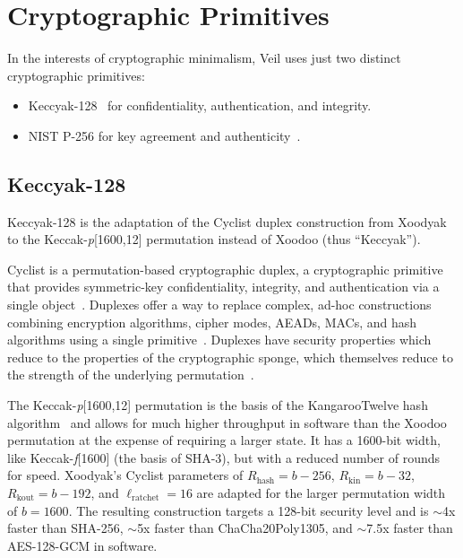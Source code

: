 \section{Cryptographic Primitives}\label{sec:cryptographic-primitives}

In the interests of cryptographic minimalism, Veil uses just two distinct cryptographic primitives:

\begin{itemize}
    \item Keccyak-128~\cite{daemen2020,bertoni2018} for confidentiality, authentication, and integrity.
    \item NIST P-256 for key agreement and authenticity~\cite{fips1864}.
\end{itemize}

\subsection{Keccyak-128}\label{subsec:keccyak}

Keccyak-128 is the adaptation of the Cyclist duplex construction from Xoodyak~\cite{daemen2020} to the
Keccak-\emph{p}[1600,12] permutation instead of Xoodoo (thus ``Keccyak'').

Cyclist is a permutation-based cryptographic duplex, a cryptographic primitive that provides symmetric-key
confidentiality, integrity, and authentication via a single object~\cite{daemen2020}.
Duplexes offer a way to replace complex, ad-hoc constructions combining encryption algorithms, cipher modes,
AEADs, MACs, and hash algorithms using a single primitive~\cite{daemen2020, bertoni2011duplex}.
Duplexes have security properties which reduce to the properties of the cryptographic sponge, which themselves reduce to
the strength of the underlying permutation~\cite{bertoni2008}.

The Keccak-\emph{p}[1600,12] permutation is the basis of the KangarooTwelve hash algorithm~\cite{bertoni2018} and allows
for much higher throughput in software than the Xoodoo permutation at the expense of requiring a larger state.
It has a 1600-bit width, like Keccak-\emph{f}[1600] (the basis of SHA-3), but with a reduced number of rounds for speed.
Xoodyak's Cyclist parameters of $R_\text{hash}=b-256$, $R_\text{kin}=b-32$, $R_\text{kout}=b-192$, and
$\ell_\text{ratchet}=16$ are adapted for the larger permutation width of $b=1600$.
The resulting construction targets a 128-bit security level and is $\sim$4x faster than SHA-256, $\sim$5x faster
than ChaCha20Poly1305, and $\sim$7.5x faster than AES-128-GCM in software.


